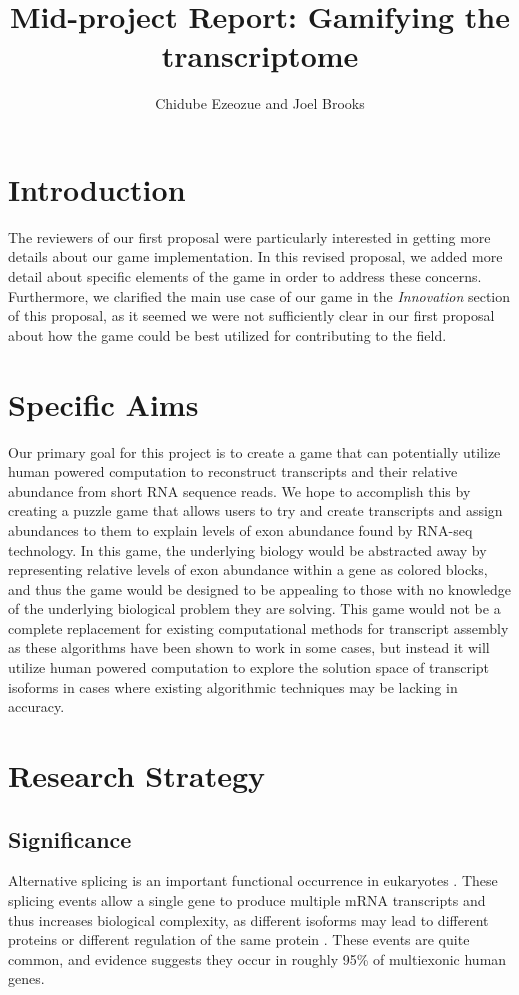 \documentclass[12pt]{article}
\title{Mid-project Report: Gamifying the transcriptome}
\author{Chidube Ezeozue and Joel Brooks}
\begin{document}

\renewcommand\refname{Bibliography}
\maketitle

\section*{Introduction}
The reviewers of our first proposal were particularly interested in getting more details about our game implementation. In this revised proposal, we added more detail about specific elements of the game in order to address these concerns. Furthermore, we clarified the main use case of our game in the \emph{Innovation} section of this proposal, as it seemed we were not sufficiently clear in our first proposal about how the game could be best utilized for contributing to the field.

\section*{Specific Aims}
Our primary goal for this project is to create a game that can potentially utilize human powered computation to reconstruct transcripts and their relative abundance from short RNA sequence reads. We hope to accomplish this by creating a puzzle game that allows users to try and create transcripts and assign abundances to them to explain levels of exon abundance found by RNA-seq technology. In this game, the underlying biology would be abstracted away by representing relative levels of exon abundance within a gene as colored blocks, and thus the game would be designed to be appealing to those with no knowledge of the underlying biological problem they are solving. This game would not be a complete replacement for existing computational methods for transcript assembly as these algorithms have been shown to work in some cases, but instead it will utilize human powered computation to explore the solution space of transcript isoforms in cases where existing algorithmic techniques may be lacking in accuracy.

\section*{Research Strategy}

\subsection*{Significance}
Alternative splicing is an important functional occurrence in eukaryotes \citep{pan2008deep}. These splicing events allow a single gene to produce multiple mRNA transcripts and thus increases biological complexity, as different isoforms may lead to different proteins or different regulation of the same protein \citep{trapnell2010transcript}. These events are quite common, and evidence suggests they occur in roughly 95\% of multiexonic human genes.
\end{document}
